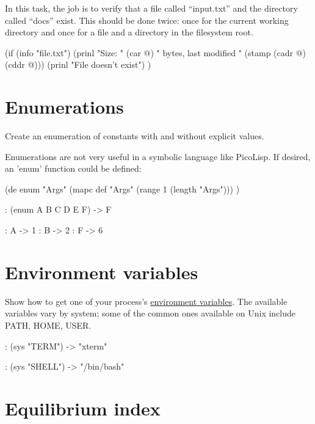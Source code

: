 In this task, the job is to verify that a file called ``input.txt'' and
the directory called ``docs'' exist. This should be done twice: once for
the current working directory and once for a file and a directory in the
filesystem root.


\begin{wideverbatim}

(if (info "file.txt")
   (prinl "Size: " (car @) " bytes, last modified " (stamp (cadr @) (cddr @)))
   (prinl "File doesn't exist") )

\end{wideverbatim}

\pagebreak{}
\section*{Enumerations}

Create an enumeration of constants with and without explicit values.

\begin{wideverbatim}

Enumerations are not very useful in a symbolic language like PicoLisp. If
desired, an 'enum' function could be defined:

(de enum "Args"
   (mapc def "Args" (range 1 (length "Args"))) )

: (enum A B C D E F)
-> F

: A
-> 1
: B
-> 2
: F
-> 6

\end{wideverbatim}

\pagebreak{}
\section*{Environment variables}

Show how to get one of your process's
\href{http://en.wikipedia.org/wiki/Environment\_variable}{environment
  variables}. The available variables vary by system; some of the
common ones available on Unix include PATH, HOME, USER.


\begin{wideverbatim}

: (sys "TERM")
-> "xterm"

: (sys "SHELL")
-> "/bin/bash"

\end{wideverbatim}

\pagebreak{}
\section*{Equilibrium index}


